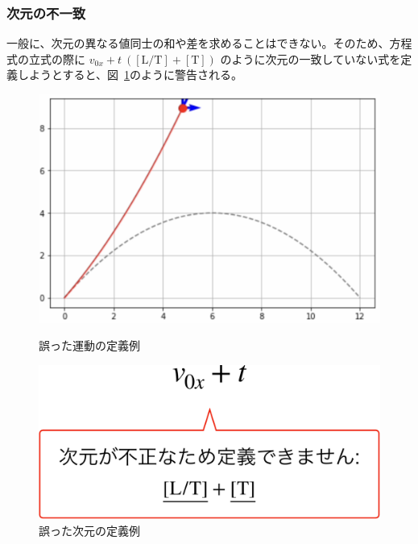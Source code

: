 \subsubsection*{次元の不一致}
一般に、次元の異なる値同士の和や差を求めることはできない。そのため、方程式の立式の際に $v_{0x} + t ~\mathrm{([L/T] + [T])}$ のように次元の一致していない式を定義しようとすると、図~\ref{wrongdim}のように警告される。

\begin{figure}[htb]
\centering
\begin{minipage}{0.5\linewidth}
\includegraphics*[width=\linewidth]{work/wrong_move.png}
\caption{誤った運動の定義例} \label{wrongmove}
\end{minipage}
\quad
\begin{minipage}{0.35\linewidth}
\includegraphics*[width=\linewidth]{work/wrong_dim-crop.pdf}
\caption{誤った次元の定義例} \label{wrongdim}
\end{minipage}
\end{figure}
